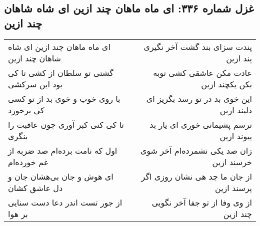\begin{center}
\section*{غزل شماره ۳۳۶: ای ماه ماهان چند ازین ای شاه شاهان چند ازین}
\label{sec:336}
\begin{longtable}{l p{0.5cm} r}
ای ماه ماهان چند ازین ای شاه شاهان چند ازین
&&
پندت سزای بند گشت آخر نگیری پند ازین
\\
گشتی تو سلطان از کشی تا کی بود این سرکشی
&&
عادت مکن عاشقی کشی توبه بکن یکچند ازین
\\
با روی خوب و خوی بد از تو کسی کی برخورد
&&
این خوی بد در تو رسد بگریز ای دلبند ازین
\\
تا کی کنی کبر آوری چون عاقبت را بنگری
&&
ترسم پشیمانی خوری ای یار بد پیوند ازین
\\
اول که نامت برده‌ام صد ضربه از غم خورده‌ام
&&
زان صد یکی نشمرده‌ام آخر شوی خرسند ازین
\\
ای هوش و جان بی‌هشان جان و دل عاشق کشان
&&
از جان ما چد هی نشان روزی اگر پرسند ازین
\\
از جور تست اندر دعا دست سنایی بر هوا
&&
از وی وفا از تو جفا آخر نگویی چند ازین
\\
\end{longtable}
\end{center}

